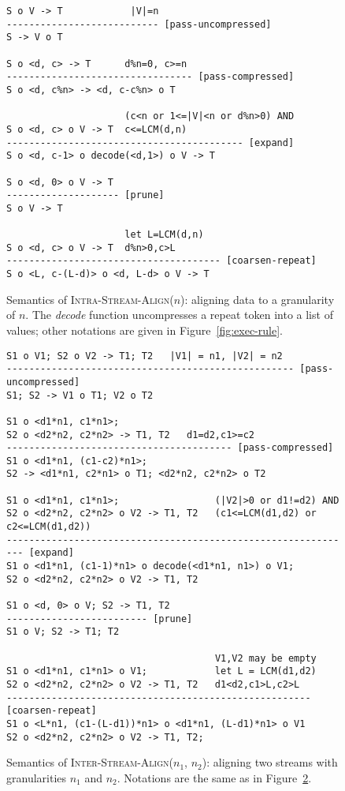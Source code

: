 \begin{figure}[t]
\scriptsize
\begin{verbatim}
S o V -> T            |V|=n
--------------------------- [pass-uncompressed]
S -> V o T

S o <d, c> -> T      d%n=0, c>=n
--------------------------------- [pass-compressed]
S o <d, c%n> -> <d, c-c%n> o T

                     (c<n or 1<=|V|<n or d%n>0) AND
S o <d, c> o V -> T  c<=LCM(d,n)
------------------------------------------ [expand]
S o <d, c-1> o decode(<d,1>) o V -> T

S o <d, 0> o V -> T
-------------------- [prune]
S o V -> T

                     let L=LCM(d,n)
S o <d, c> o V -> T  d%n>0,c>L
-------------------------------------- [coarsen-repeat]
S o <L, c-(L-d)> o <d, L-d> o V -> T
\end{verbatim}
\caption{Semantics of \textsc{Intra-Stream-Align}($n$): aligning data
to a granularity of $n$.  The \mbox{\it decode} function uncompresses
a repeat token into a list of values; other notations are given in
Figure~\ref{fig:exec-rule}. \protect\label{fig:intra-stream-align}}
\end{figure}

\begin{figure}[t]
\scriptsize
\begin{verbatim}
S1 o V1; S2 o V2 -> T1; T2   |V1| = n1, |V2| = n2
--------------------------------------------------- [pass-uncompressed]
S1; S2 -> V1 o T1; V2 o T2 

S1 o <d1*n1, c1*n1>; 
S2 o <d2*n2, c2*n2> -> T1, T2   d1=d2,c1>=c2
---------------------------------------- [pass-compressed]
S1 o <d1*n1, (c1-c2)*n1>; 
S2 -> <d1*n1, c2*n1> o T1; <d2*n2, c2*n2> o T2

S1 o <d1*n1, c1*n1>;                 (|V2|>0 or d1!=d2) AND
S2 o <d2*n2, c2*n2> o V2 -> T1, T2   (c1<=LCM(d1,d2) or c2<=LCM(d1,d2))
-------------------------------------------------------------- [expand]
S1 o <d1*n1, (c1-1)*n1> o decode(<d1*n1, n1>) o V1;
S2 o <d2*n2, c2*n2> o V2 -> T1, T2

S1 o <d, 0> o V; S2 -> T1, T2
------------------------- [prune]
S1 o V; S2 -> T1; T2

                                     V1,V2 may be empty
S1 o <d1*n1, c1*n1> o V1;            let L = LCM(d1,d2)
S2 o <d2*n2, c2*n2> o V2 -> T1, T2   d1<d2,c1>L,c2>L
------------------------------------------------------ [coarsen-repeat]
S1 o <L*n1, (c1-(L-d1))*n1> o <d1*n1, (L-d1)*n1> o V1
S2 o <d2*n2, c2*n2> o V2 -> T1, T2;
\end{verbatim}
\caption{Semantics of \textsc{Inter-Stream-Align}($n_1$, $n_2$):
aligning two streams with granularities $n_1$ and $n_2$.  Notations
are the same as in Figure~\ref{fig:inter-stream-align}.
\protect\label{fig:inter-stream-align}}
\end{figure}

